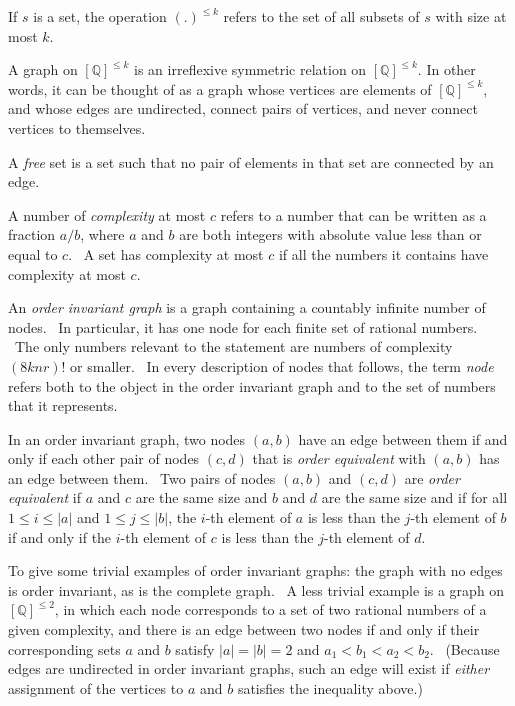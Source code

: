 \documentclass[11pt]{article}
\begin{document}
If $s$ is a set, the operation $(.)^{\le k}$ refers to the set of all subsets of $s$ with size at most $k$.

A graph on $[\mathbb{Q}]^{\le k}$ is an irreflexive symmetric relation on $[\mathbb{Q}]^{\le k}$. In other words, it can be thought of as a graph whose vertices are elements of $[\mathbb{Q}]^{\le k}$, and whose edges are undirected, connect pairs of vertices, and never connect vertices to themselves.

A \emph{free} set is a set such that no pair of elements in that set are connected by an edge.

A number of \emph{complexity} at most $c$ refers to a number that can be written as a fraction $a/b$, where $a$ and $b$ are both integers with absolute value less than or equal to $c$. \ A set has complexity at most $c$ if all the numbers it contains have complexity at most $c$.

An \emph{order invariant graph} is a graph containing a countably infinite number of nodes. \ In particular, it has one node for each finite set of rational numbers. \ The only numbers relevant to the statement are numbers of complexity $(8knr)!$ or smaller. \ In every description of nodes that follows, the term \emph{node} refers both to the object in the order invariant graph and to the set of numbers that it represents.

In an order invariant graph, two nodes $(a,b)$ have an edge between them if and only if each other pair of nodes $(c,d)$ that is \emph{order equivalent} with $(a,b)$ has an edge between them. \ Two pairs of nodes $(a, b)$ and $(c, d)$ are \emph{order equivalent} if $a$ and $c$ are the same size and $b$ and $d$ are the same size and if for all $1 \le i \le |a|$ and $1 \le j \le |b|$, the $i$-th element of $a$ is less than the $j$-th element of $b$ if and only if the $i$-th element of $c$ is less than the $j$-th element of $d$.

To give some trivial examples of order invariant graphs: the graph with no edges is order invariant, as is the complete graph. \ A less trivial example is a graph on $[\mathbb{Q}]^{\le 2}$, in which each node corresponds to a set of two rational numbers of a given complexity, and there is an edge between two nodes if and only if their corresponding sets $a$ and $b$ satisfy $|a| = |b| = 2$ and $a_1 < b_1 < a_2 < b_2$. \ (Because edges are undirected in order invariant graphs, such an edge will exist if \emph{either} assignment of the vertices to $a$ and $b$ satisfies the inequality above.)
\end{document}
